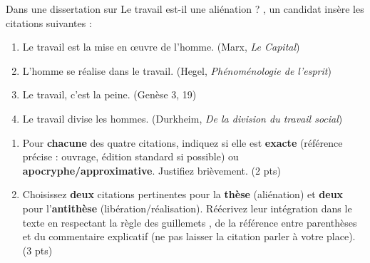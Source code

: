 \documentclass[11pt]{article}
\begin{document}
\begin{exercice}
Dans une dissertation sur \og Le travail est-il une aliénation ? \fg{}, un candidat insère les citations suivantes :
\begin{enumerate}
    \item \og Le travail est la mise en œuvre de l'homme. \fg{} (Marx, \textit{Le Capital})
    \item \og L'homme se réalise dans le travail. \fg{} (Hegel, \textit{Phénoménologie de l'esprit})
    \item \og Le travail, c'est la peine. \fg{} (Genèse 3, 19)
    \item \og Le travail divise les hommes. \fg{} (Durkheim, \textit{De la division du travail social})
\end{enumerate}
\begin{enumerate}
    \item Pour \textbf{chacune} des quatre citations, indiquez si elle est \textbf{exacte} (référence précise : ouvrage, édition standard si possible) ou \textbf{apocryphe/approximative}. Justifiez brièvement. (2 pts)
    \item Choisissez \textbf{deux} citations pertinentes pour la \textbf{thèse} (aliénation) et \textbf{deux} pour l'\textbf{antithèse} (libération/réalisation). Réécrivez leur intégration dans le texte en respectant la règle des \og guillemets \fg{}, de la \og référence entre parenthèses \fg{} et du \og commentaire explicatif \fg{} (ne pas laisser la citation parler à votre place). (3 pts)
\end{enumerate}
\end{exercice}
\end{document}
